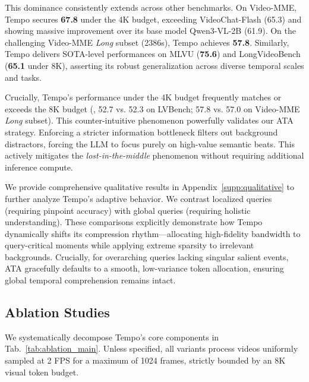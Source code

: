 %
This dominance consistently extends across other benchmarks. On Video-MME, Tempo secures \textbf{67.8} under the 4K budget, exceeding VideoChat-Flash (65.3) and showing massive improvement over its base model Qwen3-VL-2B (61.9). On the challenging Video-MME \textit{Long} subset (2386s), Tempo achieves \textbf{57.8}. Similarly, Tempo delivers SOTA-level performances on MLVU (\textbf{75.6}) and LongVideoBench (\textbf{65.1} under 8K), asserting its robust generalization across diverse temporal scales and tasks.


%
Crucially, Tempo's performance under the 4K budget frequently matches or exceeds the 8K budget (\eg, 52.7 vs. 52.3 on LVBench; 57.8 vs. 57.0 on Video-MME \textit{Long} subset). This counter-intuitive phenomenon powerfully validates our ATA strategy. Enforcing a stricter information bottleneck filters out background distractors, forcing the LLM to focus purely on high-value semantic beats. This actively mitigates the \emph{lost-in-the-middle} phenomenon without requiring additional inference compute.

%
We provide comprehensive qualitative results in Appendix~\ref{supp:qualitative} to further analyze Tempo's adaptive behavior. We contrast localized queries (requiring pinpoint accuracy) with global queries (requiring holistic understanding). These comparisons explicitly demonstrate how Tempo dynamically shifts its compression rhythm---allocating high-fidelity bandwidth to query-critical moments while applying extreme sparsity to irrelevant backgrounds. Crucially, for overarching queries lacking singular salient events, ATA gracefully defaults to a smooth, low-variance token allocation, ensuring global temporal comprehension remains intact.




\subsection{Ablation Studies}
\label{sec:exp:ablation}


We systematically decompose Tempo's core components in Tab.~\ref{tab:ablation_main}. Unless specified, all variants process videos uniformly sampled at 2 FPS for a maximum of 1024 frames, strictly bounded by an 8K visual token budget.

